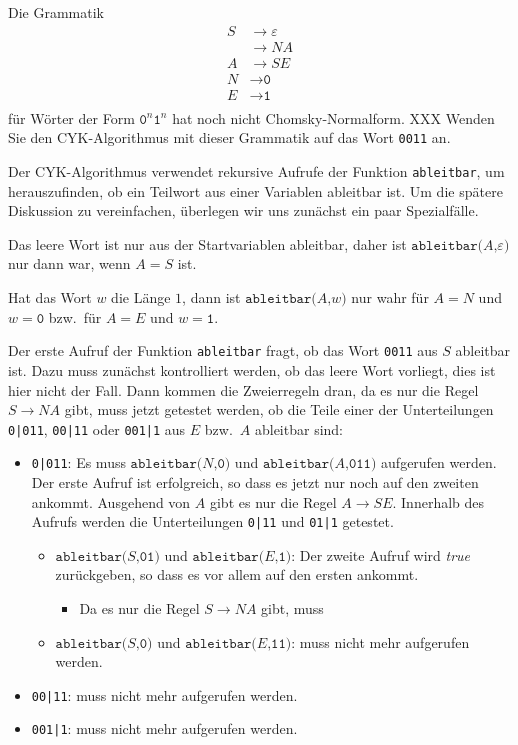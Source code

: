 Die Grammatik
\begin{align*}
S&\to \varepsilon \\
 &\to NA \\
A&\to SE \\
N&\to \texttt{0} \\
E&\to \texttt{1} \\
\end{align*}
für Wörter der Form
$\texttt{0}^n\texttt{1}^n$
hat noch nicht Chomsky-Normalform.
XXX
Wenden Sie den CYK-Algorithmus mit dieser Grammatik auf das Wort
\texttt{0011} an.

\def\ableitbar#1#2{
	\texttt{ableitbar(}#1\texttt{,}#2\texttt{)}
}

\begin{loesung}
Der CYK-Algorithmus verwendet rekursive Aufrufe der Funktion
\texttt{ableitbar}, um herauszufinden, ob ein Teilwort aus einer 
Variablen ableitbar ist.
Um die spätere Diskussion zu vereinfachen, überlegen wir uns zunächst
ein paar Spezialfälle.

Das leere Wort ist nur aus der Startvariablen ableitbar, daher ist
$\ableitbar{A}{\varepsilon}$ nur dann war, wenn $A=S$ ist.

Hat das Wort $w$ die Länge $1$, dann ist 
$\ableitbar{A}{w}$ nur wahr
für $A=N$ und $w=\texttt{0}$
bzw.~für $A=E$ und $w=\texttt{1}$.

Der erste Aufruf der Funktion \texttt{ableitbar} fragt, ob das Wort
\texttt{0011} aus $S$ ableitbar ist.
Dazu muss zunächst kontrolliert werden, ob das leere Wort vorliegt,
dies ist hier nicht der Fall.
Dann kommen die Zweierregeln dran, da es nur die Regel $S\to NA$
gibt, muss jetzt getestet werden, ob die Teile einer der Unterteilungen
\texttt{0|011},
\texttt{00|11} oder
\texttt{001|1}
aus $E$ bzw.~$A$ ableitbar sind:
\begin{itemize}
\item
\texttt{0|011}:
Es muss $\ableitbar{N}{\texttt{0}}$ und $\ableitbar{A}{\texttt{011}}$ 
aufgerufen werden.
Der erste Aufruf ist erfolgreich, so dass es jetzt nur noch auf den
zweiten ankommt.
Ausgehend von $A$ gibt es nur die Regel $A\to SE$.
Innerhalb des Aufrufs werden die Unterteilungen
\texttt{0|11} 
und
\texttt{01|1} 
getestet.
\begin{itemize}
\item
$\ableitbar{S}{\texttt{01}}$ und $\ableitbar{E}{\texttt{1}}$:
Der zweite Aufruf wird {\em true} zurückgeben, so dass es vor allem
auf den ersten ankommt.
\begin{itemize}
\item
Da es nur die Regel $S\to NA$ gibt, muss 
\end{itemize}
\item
$\ableitbar{S}{\texttt{0}}$ und $\ableitbar{E}{\texttt{11}}$:
muss nicht mehr aufgerufen werden.
\end{itemize}
\item
\texttt{00|11}: muss nicht mehr aufgerufen werden.
\item
\texttt{001|1}: muss nicht mehr aufgerufen werden.
\end{itemize}



\end{loesung}

